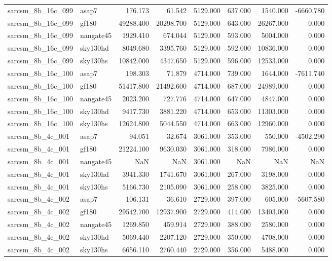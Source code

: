 \begin{tabular}{llrrrrrr}
sarcsm\_8b\_16c\_099 & asap7 & 176.173 & 61.542 & 5129.000 & 637.000 & 1540.000 & -6660.780 \\
sarcsm\_8b\_16c\_099 & gf180 & 49288.400 & 20298.700 & 5129.000 & 643.000 & 26267.000 & 0.000 \\
sarcsm\_8b\_16c\_099 & nangate45 & 1929.410 & 674.044 & 5129.000 & 593.000 & 5004.000 & 0.000 \\
sarcsm\_8b\_16c\_099 & sky130hd & 8049.680 & 3395.760 & 5129.000 & 592.000 & 10836.000 & 0.000 \\
sarcsm\_8b\_16c\_099 & sky130hs & 10842.000 & 4347.650 & 5129.000 & 596.000 & 12533.000 & 0.000 \\
sarcsm\_8b\_16c\_100 & asap7 & 198.303 & 71.879 & 4714.000 & 739.000 & 1644.000 & -7611.740 \\
sarcsm\_8b\_16c\_100 & gf180 & 51417.800 & 21492.600 & 4714.000 & 687.000 & 24989.000 & 0.000 \\
sarcsm\_8b\_16c\_100 & nangate45 & 2023.200 & 727.776 & 4714.000 & 647.000 & 4847.000 & 0.000 \\
sarcsm\_8b\_16c\_100 & sky130hd & 9417.730 & 3881.220 & 4714.000 & 653.000 & 11303.000 & 0.000 \\
sarcsm\_8b\_16c\_100 & sky130hs & 12624.800 & 5044.550 & 4714.000 & 663.000 & 12960.000 & 0.000 \\
sarcsm\_8b\_4c\_001 & asap7 & 94.051 & 32.674 & 3061.000 & 353.000 & 550.000 & -4502.290 \\
sarcsm\_8b\_4c\_001 & gf180 & 21224.100 & 9630.030 & 3061.000 & 318.000 & 7986.000 & 0.000 \\
sarcsm\_8b\_4c\_001 & nangate45 & NaN & NaN & 3061.000 & NaN & NaN & NaN \\
sarcsm\_8b\_4c\_001 & sky130hd & 3941.330 & 1741.670 & 3061.000 & 267.000 & 3198.000 & 0.000 \\
sarcsm\_8b\_4c\_001 & sky130hs & 5166.730 & 2105.090 & 3061.000 & 258.000 & 3825.000 & 0.000 \\
sarcsm\_8b\_4c\_002 & asap7 & 106.131 & 36.610 & 2729.000 & 397.000 & 605.000 & -5607.580 \\
sarcsm\_8b\_4c\_002 & gf180 & 29542.700 & 12937.900 & 2729.000 & 414.000 & 13403.000 & 0.000 \\
sarcsm\_8b\_4c\_002 & nangate45 & 1269.850 & 459.914 & 2729.000 & 388.000 & 2580.000 & 0.000 \\
sarcsm\_8b\_4c\_002 & sky130hd & 5069.440 & 2207.120 & 2729.000 & 350.000 & 4708.000 & 0.000 \\
sarcsm\_8b\_4c\_002 & sky130hs & 6656.110 & 2760.440 & 2729.000 & 356.000 & 5488.000 & 0.000 \\

\end{tabular}
